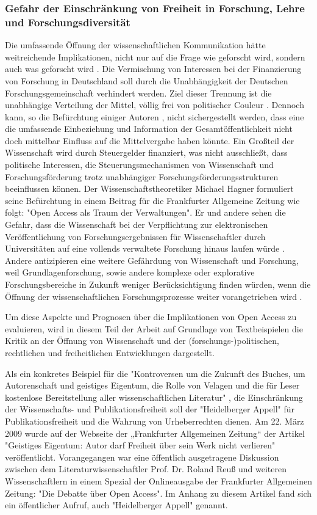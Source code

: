 \subsubsection{Gefahr der Einschränkung von Freiheit in Forschung, Lehre und Forschungsdiversität}

Die umfassende Öffnung der wissenschaftlichen Kommunikation hätte weitreichende Implikationen, nicht nur auf die Frage wie geforscht wird, sondern auch was geforscht wird \cite{suchen}. Die Vermischung von Interessen bei der Finanzierung von Forschung in Deutschland soll durch die Unabhängigkeit der Deutschen Forschungsgemeinschaft verhindert werden. Ziel dieser Trennung ist die unabhängige Verteilung der Mittel, völlig frei von politischer Couleur \cite{suchen}. Dennoch kann, so die Befürchtung einiger Autoren \cite{suchen}, nicht sichergestellt werden, dass eine die umfassende Einbeziehung und Information der Gesamtöffentlichkeit nicht doch mittelbar Einfluss auf die Mittelvergabe haben könnte. Ein Großteil der Wissenschaft wird durch Steuergelder finanziert, was nicht ausschließt, dass politische Interessen, die Steuerungsmechanismen von Wissenschaft und Forschungsförderung trotz unabhängiger Forschungsförderungsstrukturen beeinflussen können. Der Wissenschaftstheoretiker Michael Hagner formuliert seine Befürchtung in einem Beitrag für die Frankfurter Allgemeine Zeitung wie folgt: "Open Access als Traum der Verwaltungen". Er und andere sehen die Gefahr, dass die Wissenschaft bei der Verpflichtung zur elektronischen Veröffentlichung von Forschungsergebnissen für Wissenschaftler durch Universitäten auf eine vollends verwaltete Forschung hinaus laufen würde \cite{suchen}. Andere antizipieren eine weitere Gefährdung von Wissenschaft und Forschung, weil Grundlagenforschung, sowie andere komplexe oder explorative Forschungsbereiche in Zukunft weniger Berücksichtigung finden würden, wenn die Öffnung der wissenschaftlichen Forschungsprozesse weiter vorangetrieben wird \cite{suchen}.

Um diese Aspekte und Prognosen über die Implikationen von Open Access zu evaluieren, wird in diesem Teil der Arbeit auf Grundlage von Textbeispielen die Kritik an der Öffnung von Wissenschaft und der (forschungs-)politischen, rechtlichen und freiheitlichen Entwicklungen dargestellt.

Als ein konkretes Beispiel für die "Kontroversen um die Zukunft des Buches, um Autorenschaft und geistiges Eigentum, die Rolle von Velagen und die für Leser kostenlose Bereitstellung aller wissenschaftlichen Literatur" \cite{hagner_2015_sache_buches}, die Einschränkung der Wissenschafts- und Publikationsfreiheit soll der "Heidelberger Appell" für Publikationsfreiheit und die Wahrung von Urheberrechten dienen. Am 22. März 2009 wurde auf der Webseite der „Frankfurter Allgemeinen Zeitung“ der Artikel "Geistiges Eigentum: Autor darf Freiheit über sein Werk nicht verlieren" \cite{faz_heidelberger_apell_2009} veröffentlicht. Vorangegangen war eine öffentlich ausgetragene Diskussion zwischen dem Literaturwissenschaftler Prof. Dr. Roland Reuß und weiteren Wissenschaftlern in einem Spezial der Onlineausgabe der Frankfurter Allgemeinen Zeitung: "Die Debatte über Open Access". Im Anhang zu diesem Artikel fand sich ein öffentlicher Aufruf, auch "Heidelberger Appell" genannt.

